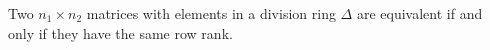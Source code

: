 Two $n_1 \times n_2$ matrices with elements in a division ring $\Delta$ are equivalent if and only if they have the same row rank.
